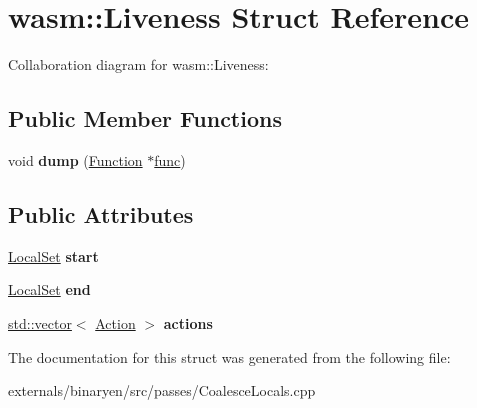 \hypertarget{structwasm_1_1_liveness}{}\section{wasm\+:\+:Liveness Struct Reference}
\label{structwasm_1_1_liveness}


Collaboration diagram for wasm\+:\+:Liveness\+:
\subsection*{Public Member Functions}
\begin{DoxyCompactItemize}
\item 
\mbox{\label{structwasm_1_1_liveness_a0bf35bf0dc11ab362da51291bb5571bd}} 
void {\bfseries dump} (\mbox{\hyperlink{classwasm_1_1_function}{Function}} $\ast$\mbox{\hyperlink{structfunc}{func}})
\end{DoxyCompactItemize}
\subsection*{Public Attributes}
\begin{DoxyCompactItemize}
\item 
\mbox{\label{structwasm_1_1_liveness_a5186bbb7f5b1e02a7d3818a321744ef5}} 
\mbox{\hyperlink{structwasm_1_1_local_set}{Local\+Set}} {\bfseries start}
\item 
\mbox{\label{structwasm_1_1_liveness_a9e342edc4360a90f3cb7057290c969c6}} 
\mbox{\hyperlink{structwasm_1_1_local_set}{Local\+Set}} {\bfseries end}
\item 
\mbox{\label{structwasm_1_1_liveness_a0a07b6584f2d1943b5d049d6ef497903}} 
\mbox{\hyperlink{classstd_1_1vector}{std\+::vector}}$<$ \mbox{\hyperlink{structwasm_1_1_action}{Action}} $>$ {\bfseries actions}
\end{DoxyCompactItemize}


The documentation for this struct was generated from the following file\+:\begin{DoxyCompactItemize}
\item 
externals/binaryen/src/passes/Coalesce\+Locals.\+cpp\end{DoxyCompactItemize}

